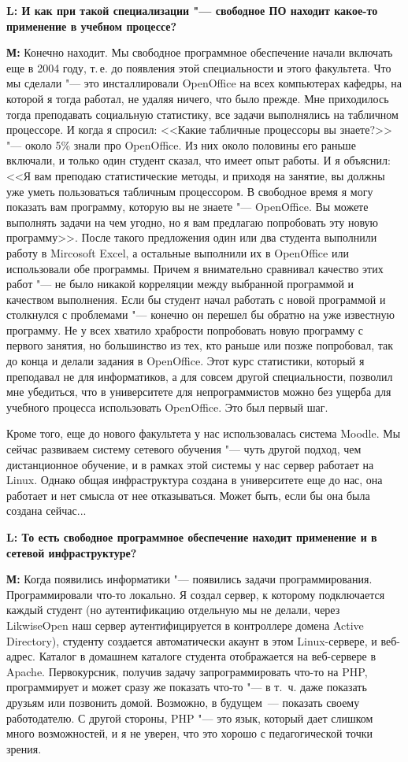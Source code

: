\documentclass[10pt, a5paper]{article}
\begin{document}
{\noindent \bf L: И как при такой специализации "--- свободное ПО находит какое-то применение в учебном процессе?}

{\noindent \bf М:} Конечно находит. Мы свободное программное обеспечение начали включать еще в 2004 году, т.\,е. до появления этой специальности и этого факультета. Что мы сделали "--- это инсталлировали OpenOffice на всех компьютерах кафедры, на которой я тогда работал, не удаляя ничего, что было прежде. Мне приходилось тогда преподавать социальную статистику, все задачи выполнялись на табличном процессоре. И когда я спросил: <<Какие табличные процессоры вы знаете?>> "--- около 5\% знали про OpenOffice. Из них около половины его раньше включали, и только один студент сказал, что имеет опыт работы. И я объяснил: <<Я вам преподаю статистические методы, и приходя на занятие, вы должны уже уметь пользоваться табличным процессором. В свободное время я могу показать вам программу, которую вы не знаете "--- OpenOffice. Вы можете выполнять задачи на чем угодно, но я вам предлагаю попробовать эту новую программу>>. После такого предложения один или два студента выполнили работу в Mircosoft Excel, а остальные выполнили их в OpenOffice или использовали обе программы. Причем я внимательно сравнивал качество этих работ "--- не было никакой корреляции между выбранной программой и качеством выполнения. Если бы студент начал работать с новой программой и столкнулся с проблемами "--- конечно он перешел бы обратно на уже известную программу. Не у всех хватило храбрости попробовать новую программу с первого занятия, но большинство из тех, кто раньше или позже попробовал, так до конца и делали задания в OpenOffice. Этот курс статистики, который я преподавал не для информатиков, а для совсем другой специальности, позволил мне убедиться, что в университете для непрограммистов можно без ущерба для учебного процесса использовать OpenOffice. Это был первый шаг.

Кроме того, еще до нового факультета у нас использовалась система Moodle. Мы сейчас развиваем систему сетевого обучения "--- чуть другой подход, чем дистанционное обучение, и в рамках этой системы у нас сервер работает на Linux. Однако общая  инфраструктура создана в университете еще до нас, она работает и нет смысла от нее отказываться. Может быть, если бы она была создана сейчас...

{\noindent \bf L: То есть свободное программное обеспечение находит применение и в сетевой инфраструктуре?}

{\noindent \bf М:} Когда появились информатики "--- появились задачи программирования. Программировали что-то локально. Я  создал сервер, к которому подключается каждый студент (но аутентификацию отдельную мы не делали, через LikwiseOpen наш сервер аутентифицируется в контроллере домена Active Directory), студенту создается автоматически акаунт в этом Linux-сервере, и веб-адрес. Каталог в домашнем каталоге студента отображается на веб-сервере в Apache. Первокурсник, получив задачу запрограммировать что-то на PHP, программирует и может сразу же показать что-то "--- в т.~ч. даже показать друзьям или позвонить домой. Возможно, в будущем~--- показать своему работодателю. С другой стороны, PHP "--- это язык, который дает слишком много возможностей, и я не уверен, что это хорошо с педагогической точки зрения.
\end{document}
